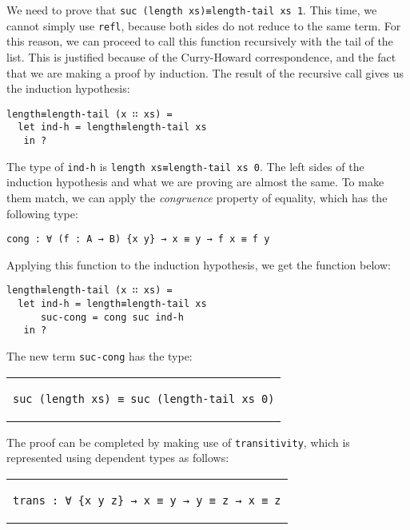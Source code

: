\documentclass[runningheads]{llncs}
\begin{document}
We need to prove that \lstinline{suc (length xs)≡length-tail xs 1}. This time, we cannot
simply use \lstinline{refl}, because both sides do not reduce to the same term. For this
reason, we can proceed to call this function recursively with the tail of the list. This
is justified because of the Curry-Howard correspondence, and the fact that we are making
a proof by induction. The result of the recursive call gives us the induction hypothesis:

\begin{lstlisting}
length≡length-tail (x ∷ xs) =
  let ind-h = length≡length-tail xs
   in ?
\end{lstlisting}

The type of \lstinline{ind-h} is \lstinline{length xs≡length-tail xs 0}. The left sides
of the induction hypothesis and what we are proving are almost the same. To make them
match, we can apply the \emph{congruence} property of equality, which has the following
type:

\begin{lstlisting}
cong : ∀ (f : A → B) {x y} → x ≡ y → f x ≡ f y
\end{lstlisting}

Applying this function to the induction hypothesis, we get the function below:

\begin{lstlisting}
length≡length-tail (x ∷ xs) =
  let ind-h = length≡length-tail xs
      suc-cong = cong suc ind-h
   in ?
\end{lstlisting}

The new term \lstinline{suc-cong} has the type:

\begin{center}
\begin{tabular}{c}
\begin{lstlisting}
suc (length xs) ≡ suc (length-tail xs 0)
\end{lstlisting}
\end{tabular}
\end{center}

The proof can be completed by making use of \lstinline{transitivity}, which is
represented using dependent types as follows:

\begin{center}
\begin{tabular}{c}
\begin{lstlisting}
trans : ∀ {x y z} → x ≡ y → y ≡ z → x ≡ z
\end{lstlisting}
\end{tabular}
\end{center}
\end{document}
